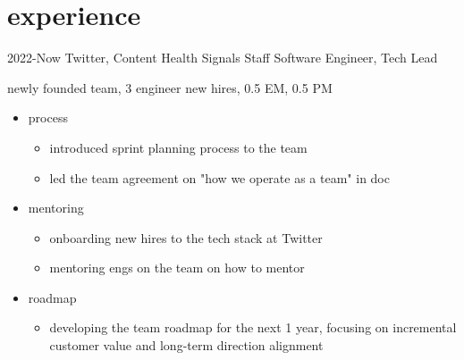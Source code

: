 \documentclass[]{friggeri-cv-a4}
\begin{document}
\section{experience}
\begin{entrylist}
\entry
    {2022-Now}
    {Twitter, Content Health Signals}
    {Staff Software Engineer, Tech Lead}
    {
      newly founded team, 3 engineer new hires, 0.5 EM, 0.5 PM
      \begin{itemize}
      \item process
        \begin{itemize}
        \item introduced sprint planning process to the team
        \item led the team agreement on "how we operate as a team" in doc
        \end{itemize}
      \item mentoring
        \begin{itemize}
        \item onboarding new hires to the tech stack at Twitter
        \item mentoring engs on the team on how to mentor
        \end{itemize}
      \item roadmap
        \begin{itemize}
        \item developing the team roadmap for the next 1 year, focusing on incremental customer value and long-term direction alignment
        \end{itemize}
      \end{itemize}
    }
\end{entrylist}
\end{document}
